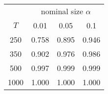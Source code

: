 % 
\begin{tabular}{cccc}
  \hline
  & \multicolumn{3}{c}{nominal size $\alpha$} \\
 $T$ & 0.01 & 0.05 & 0.1 \\
 \hline
250 & 0.758 & 0.895 & 0.946 \\ 
350 & 0.902 & 0.976 & 0.986 \\ 
  500 & 0.997 & 0.999 & 0.999 \\ 
  1000 & 1.000 & 1.000 & 1.000 \\ 
   \hline
\end{tabular}
